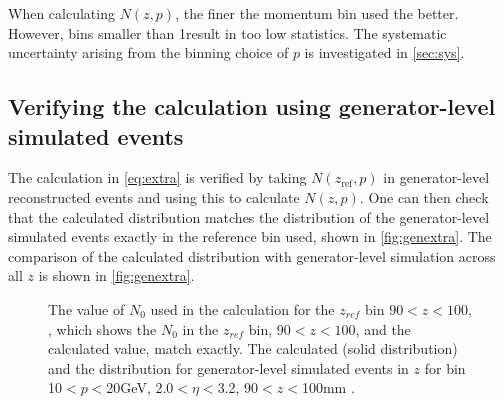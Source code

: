 When calculating $N(z,p)$, the finer the momentum bin used the better. However, bins smaller than 1\gevc result in too low statistics. The systematic uncertainty arising from the binning choice of $p$ is investigated in \autoref{sec:sys}.





\subsection{Verifying the calculation using generator-level simulated events}
\label{sec:ver}
The calculation in \autoref{eq:extra} is verified by taking $N(z_{\textrm{ref}},p)$ in generator-level reconstructed events and using this to calculate $N(z,p)$. One can then check that the calculated distribution matches the distribution of the generator-level simulated events exactly in the reference bin used, shown in \autoref{fig:genextra}\protect{}. The comparison of the calculated distribution with generator-level simulation across all $z$ is shown in \autoref{fig:genextra}\protect{}. %

\begin{figure}
\begin{center}


\end{center}
\caption{The value of $N_{0}$ used in the calculation for the $z_{ref}$ bin $90<z<100$\mm, \protect{}, which shows the $N_{0}$ in the $z_{ref}$ bin, $90<z<100$\mm, and the calculated value, match exactly. The calculated (solid distribution) and the distribution for generator-level simulated events in $z$ for bin 10$<p<$20\:GeV, 2.0$<\eta<$3.2, 90$<z<$100\:mm \protect{}.
  \label{fig:genextra}}
\end{figure}

